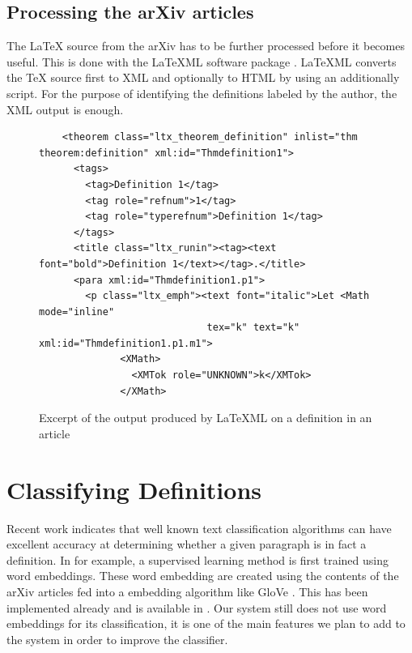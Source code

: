 \documentclass[a4paper]{easychair}
\begin{document}
\subsection{Processing the arXiv articles}
The \LaTeX{} source from the arXiv has to be further processed before it becomes useful. This is done with the LaTeXML software package \cite{miller3latexml}. LaTeXML converts the \TeX{} source first to XML and optionally to HTML by using an additionally script. For the purpose of identifying the definitions labeled by the author, the XML output is enough.

\begin{center}
\begin{figure}[h]
\begin{lstlisting}
    <theorem class="ltx_theorem_definition" inlist="thm theorem:definition" xml:id="Thmdefinition1">
      <tags>
        <tag>Definition 1</tag>
        <tag role="refnum">1</tag>
        <tag role="typerefnum">Definition 1</tag>
      </tags>
      <title class="ltx_runin"><tag><text font="bold">Definition 1</text></tag>.</title>
      <para xml:id="Thmdefinition1.p1">
        <p class="ltx_emph"><text font="italic">Let <Math mode="inline" 
                             tex="k" text="k" xml:id="Thmdefinition1.p1.m1">
              <XMath>
                <XMTok role="UNKNOWN">k</XMTok>
              </XMath>
\end{lstlisting}
    \caption{\label{xml1} Excerpt of the output produced by LaTeXML on a definition in an article}
\end{figure}
\end{center}


\section{Classifying Definitions}
Recent work indicates that well known text classification algorithms \cite{bengio2003neural,chen2017improving} can have excellent accuracy  at determining whether a given paragraph is in fact a definition.  In \cite{webscipara} for example, a supervised learning method is first trained using word embeddings.  These word embedding are created using the contents of the arXiv articles fed into a embedding algorithm like GloVe \cite{pennington2014glove}. This has been  implemented already and is available in \cite{SML}. Our system still does not use word embeddings for its classification, it is one of the main features we plan to add to the system in order to improve the classifier.
\end{document}
